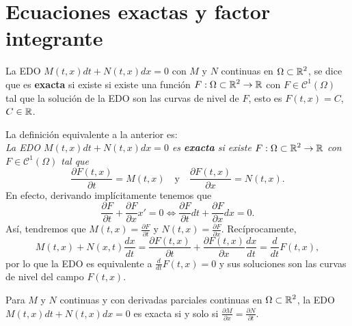 \section{Ecuaciones exactas y factor integrante}
\begin{definition}
La EDO $\displaystyle M\left(t,x\right)dt + N\left(t,x\right)dx = 0 $ con $\displaystyle M $ y $\displaystyle N $ continuas en $\displaystyle \Omega\subset\mathbb{R}^{2} $, se dice que es \textbf{exacta} si existe si existe una función $\displaystyle F : \Omega \subset \mathbb{R}^{2} \to \mathbb{R} $ con $\displaystyle F \in \mathcal{C}^{1}\left(\Omega \right) $ tal que la solución de la EDO son las curvas de nivel de $\displaystyle F $, esto es $\displaystyle F\left(t,x\right)=C $, $\displaystyle C \in \mathbb{R} $.
\end{definition}
\begin{observation}
La definición equivalente a la anterior es: \\

\textit{La EDO $\displaystyle M\left(t,x\right)dt + N\left(t,x\right)dx = 0 $ es \textbf{exacta} si existe $\displaystyle F : \Omega \subset \mathbb{R}^{2} \to \mathbb{R} $ con $\displaystyle F \in \mathcal{C}^{1}\left(\Omega \right) $ tal que}
\[\frac{\partial F\left(t,x\right)}{\partial t}= M\left(t,x\right) \quad \text{y} \quad \frac{\partial F\left(t,x\right)}{\partial x}=N\left(t,x\right) .\]
En efecto, derivando implícitamente tenemos que 
\[\frac{\partial F}{\partial t} + \frac{\partial F}{\partial x}x'= 0 \iff \frac{\partial F}{\partial t}dt + \frac{\partial F}{\partial x}dx = 0.\]
Así, tendremos que $\displaystyle M\left(t,x\right)=\frac{\partial F}{\partial t} $ y $\displaystyle N\left(t,x\right)= \frac{\partial F}{\partial x} $. Recíprocamente, 
\[M\left(t,x\right) + N\left(x,t\right)\frac{dx}{dt} = \frac{\partial F\left(t,x\right)}{\partial t} + \frac{\partial F\left(t,x\right)}{\partial x}\frac{dx}{dt}=\frac{d}{dt}F\left(t,x\right) ,\]
por lo que la EDO es equivalente a $\displaystyle \frac{d}{dt}F\left(t,x\right)=0 $ y sus soluciones son las curvas de nivel del campo $\displaystyle F\left(t,x\right) $. 
\end{observation}
\begin{prop}
Para $\displaystyle M $ y $\displaystyle N $ continuas y con derivadas parciales continuas en $\displaystyle \Omega\subset \mathbb{R}^{2} $, la EDO $\displaystyle M\left(t,x\right)dt + N\left(t,x\right)dx = 0 $ es exacta si y solo si $\displaystyle \frac{\partial M}{\partial x} = \frac{\partial N}{\partial t} $. 
\end{prop}
